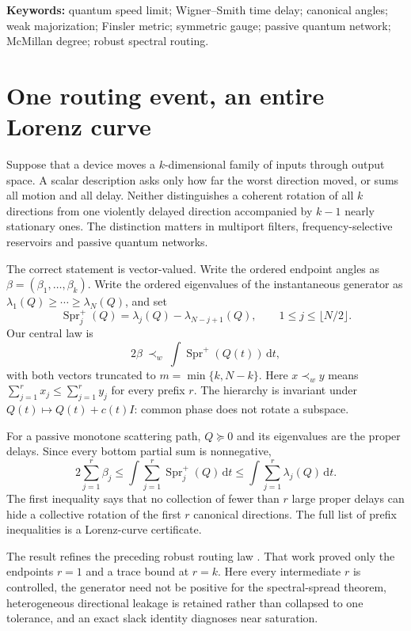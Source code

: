 \documentclass[11pt]{article}
\theoremstyle{definition}
\theoremstyle{remark}
\newcommand{\dd}{\mathrm d}
\newcommand{\Spr}{\operatorname{Spr}^{+}}
\begin{document}
\noindent\textbf{Keywords:} quantum speed limit; Wigner--Smith time delay;
canonical angles; weak majorization; Finsler metric; symmetric gauge; passive quantum network;
McMillan degree; robust spectral routing.

\section{One routing event, an entire Lorenz curve}

Suppose that a device moves a $k$-dimensional family of inputs through output
space.  A scalar description asks only how far the worst direction moved, or
sums all motion and all delay.  Neither distinguishes a coherent rotation of
all $k$ directions from one violently delayed direction accompanied by
$k-1$ nearly stationary ones.  The distinction matters in multiport filters,
frequency-selective reservoirs and passive quantum networks.

The correct statement is vector-valued.  Write the ordered endpoint angles as
$\beta=(\beta_1,\ldots,\beta_k)$.  Write the ordered eigenvalues of the
instantaneous generator as $\lambda_1(Q)\geq\cdots\geq\lambda_N(Q)$, and set
\begin{equation}\label{eq:spreadvector}
 \Spr_j(Q)=\lambda_j(Q)-\lambda_{N-j+1}(Q),\qquad
 1\leq j\leq\lfloor N/2\rfloor.
\end{equation}
Our central law is
\begin{equation}\label{eq:headline}
 2\beta\ \prec_w\ \int \Spr(Q(t))\,\dd t,
\end{equation}
with both vectors truncated to $m=\min\{k,N-k\}$.  Here $x\prec_w y$ means
$\sum_{j=1}^r x_j\leq\sum_{j=1}^r y_j$ for every prefix $r$.
The hierarchy is invariant under $Q(t)\mapsto Q(t)+c(t)I$: common phase does
not rotate a subspace.

For a passive monotone scattering path, $Q\succeq0$ and its eigenvalues are
the proper delays.  Since every bottom partial sum is nonnegative,
\begin{equation}\label{eq:properdelayheadline}
 2\sum_{j=1}^r\beta_j
 \leq \int\sum_{j=1}^r\Spr_j(Q)\,\dd t
 \leq \int\sum_{j=1}^r\lambda_j(Q)\,\dd t.
\end{equation}
The first inequality says that no collection of fewer than $r$ large proper
delays can hide a collective rotation of the first $r$ canonical directions.
The full list of prefix inequalities is a Lorenz-curve certificate.

The result refines the preceding robust routing law
\cite{ErikssonRouting2026}.  That work proved only the endpoints $r=1$ and a
trace bound at $r=k$.  Here every intermediate $r$ is controlled, the
generator need not be positive for the spectral-spread theorem, heterogeneous
directional leakage is retained rather than collapsed to one tolerance, and
an exact slack identity diagnoses near saturation.
\end{document}
